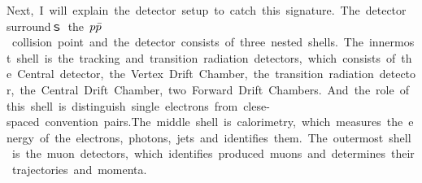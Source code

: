 Next,\ I\ will\ explain\ the\ detector\ setup\ to\ catch\ this\ signature.\ The\ detector\ surroundｓ\ the\ $p\Bar{p}$\ collision\ point\ and\ the\ detector\ consists\ of\ three\ nested\ shells.\ The\ innermost\ shell\ is\ the\ tracking\ and\ transition\ radiation\ detectors,\ which\ consists\ of\ the\ Central\ detector,\ the\ Vertex\ Drift\ Chamber,\ the\ transition\ radiation\ detector,\ the\ Central\ Drift\ Chamber,\ two\ Forward\ Drift\ Chambers.\ And\ the\ role\ of\ this\ shell\ is\ distinguish\ single\ electrons\ from\ clese-spaced\ convention\ pairs.The\ middle\ shell\ is\ calorimetry,\ which\ measures\ the\ energy\ of\ the\ electrons,\ photons,\ jets\ and\ identifies\ them.\ The\ outermost\ shell\ is\ the\ muon\ detectors,\ which\ identifies\ produced\ muons\ and\ determines\ their\ trajectories\ and\ momenta.